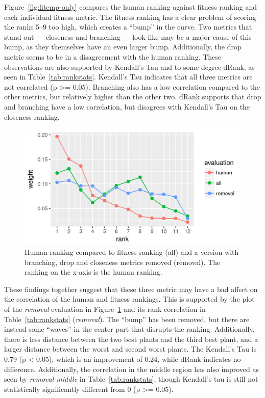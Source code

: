 Figure~\ref{fig:fitcmp-only} compares the human ranking against fitness ranking and each individual fitness metric.
The fitness ranking has a clear problem of scoring the ranks 5--9 too high, which creates a ``bump'' in the curve.
Two metrics that stand out --- closeness and branching --- look like may be a major cause of this bump, as they themselves have an even larger bump.
Additionally, the drop metric seems to be in a disagreement with the human ranking.
These observations are also supported by Kendall's Tau and to some degree dRank, as seen in Table~\ref{tab:rankstats}.
Kendall's Tau indicates that all three metrics are not correlated (p >= 0.05).
Branching also has a low correlation compared to the other metrics, but relatively higher than the other two.
dRank supports that drop and branching have a low correlation, but disagrees with Kendall's Tau on the closeness ranking.

\begin{figure}
    \centering
    \includegraphics[width=1.0\textwidth]{figures/fitcmp-removal}
    \caption[Human ranking compared to fitness ranking (all) and a version with branching, drop and closeness metrics removed (removal)]{Human ranking compared to fitness ranking (all) and a version with branching, drop and closeness metrics removed (removal). The ranking on the x-axis is the human ranking.}
    \label{fig:fitcmp-removal}
\end{figure}

These findings together suggest that these three metric may have a bad affect on the correlation of the human and fitness rankings.
This is supported by the plot of the \textit{removal} evaluation in Figure~\ref{fig:fitcmp-removal} and its rank correlation in Table~\ref{tab:rankstats} (\textit{removal}).
The ``bump'' has been removed, but there are instead some ``waves'' in the center part that disrupts the ranking.
Additionally, there is less distance between the two best plants and the third best plant, and a larger distance between the worst and second worst plants.
The Kendall's Tau is 0.79 (p < 0.05), which is an improvement of 0.24, while dRank indicates no difference.
Additionally, the correlation in the middle region has also improved as seen by \textit{removal-middle} in Table~\ref{tab:rankstats}, though Kendall's tau is still not statistically significantly different from 0 (p >= 0.05).

